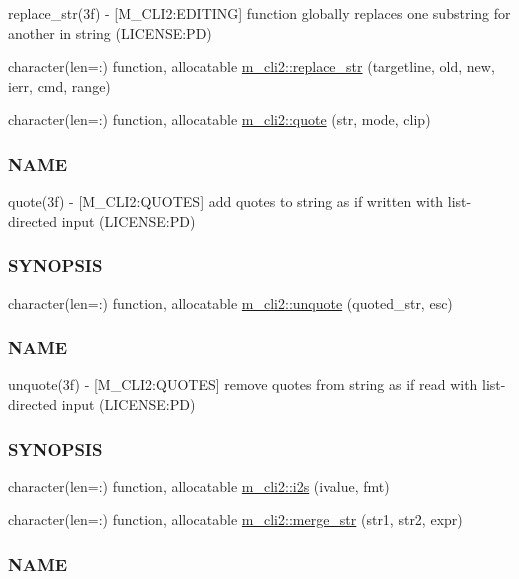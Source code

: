 \begin{DoxyCompactItemize}
\begin{DoxyCompactList}
replace\+\_\+str(3f) -\/ \mbox{[}M\+\_\+\+C\+L\+I2\+:E\+D\+I\+T\+I\+NG\mbox{]} function globally replaces one substring for another in string (L\+I\+C\+E\+N\+SE\+:PD) \end{DoxyCompactList}\item 
character(len=\+:) function, allocatable \mbox{\hyperlink{namespacem__cli2_a8f65cf1b227d837d89437368c660666f}{m\+\_\+cli2\+::replace\+\_\+str}} (targetline, old, new, ierr, cmd, range)
\item 
character(len=\+:) function, allocatable \mbox{\hyperlink{namespacem__cli2_a63f81a2c027eb5f3e0a77167ac29fc73}{m\+\_\+cli2\+::quote}} (str, mode, clip)
\begin{DoxyCompactList}\small\item\em \subsubsection*{N\+A\+ME}

quote(3f) -\/ \mbox{[}M\+\_\+\+C\+L\+I2\+:Q\+U\+O\+T\+ES\mbox{]} add quotes to string as if written with list-\/directed input (L\+I\+C\+E\+N\+SE\+:PD) \subsubsection*{S\+Y\+N\+O\+P\+S\+IS}\end{DoxyCompactList}\item 
character(len=\+:) function, allocatable \mbox{\hyperlink{namespacem__cli2_a9cab7352414f8b5625330a9ff5cf0cb4}{m\+\_\+cli2\+::unquote}} (quoted\+\_\+str, esc)
\begin{DoxyCompactList}\small\item\em \subsubsection*{N\+A\+ME}

unquote(3f) -\/ \mbox{[}M\+\_\+\+C\+L\+I2\+:Q\+U\+O\+T\+ES\mbox{]} remove quotes from string as if read with list-\/directed input (L\+I\+C\+E\+N\+SE\+:PD) \subsubsection*{S\+Y\+N\+O\+P\+S\+IS}\end{DoxyCompactList}\item 
character(len=\+:) function, allocatable \mbox{\hyperlink{namespacem__cli2_aa106d3533fd6d4845f0b3e94b2a79ffb}{m\+\_\+cli2\+::i2s}} (ivalue, fmt)
\item 
character(len=\+:) function, allocatable \mbox{\hyperlink{namespacem__cli2_a8e172feb2e4ae4d21d4fceb4e54f593c}{m\+\_\+cli2\+::merge\+\_\+str}} (str1, str2, expr)
\begin{DoxyCompactList}\small\item\em \subsubsection*{N\+A\+ME}


\end{DoxyCompactList}
\end{DoxyCompactItemize}
